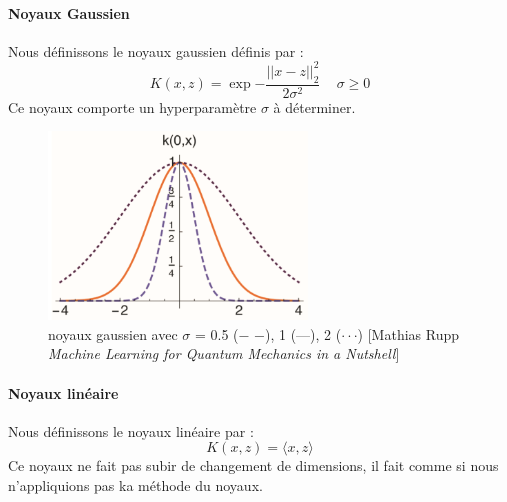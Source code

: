 \documentclass[a4paper,12pt,titlepage]{report}
\begin{document}
\paragraph{Noyaux Gaussien} 
Nous définissons le noyaux gaussien définis par :
\[ 
	K(x,z) = \exp{- \frac{||x-z||_{2}^2}{2\sigma^2}} \, \quad \sigma \geqslant 0 
\]
Ce noyaux comporte un hyperparamètre $\sigma$ à déterminer.
\begin{figure}[!h]
	\begin{center}
		\includegraphics[height = 5cm, keepaspectratio]{graphes/noyaux_gaussien.png}
		\caption{noyaux gaussien avec $\sigma$ = 0.5 ($-$ $-$), 1 (---), 2 ($\cdot\cdot\cdot$) [Mathias Rupp \textit{Machine Learning for Quantum Mechanics in a Nutshell}]}
	\end{center}
\end{figure}

\paragraph{Noyaux linéaire} Nous définissons le noyaux linéaire par :
\[ 
	K(x,z) = \langle x,z\rangle
\]
Ce noyaux ne fait pas subir de changement de dimensions, il fait comme si nous n'appliquions pas ka méthode du noyaux.
\end{document}
